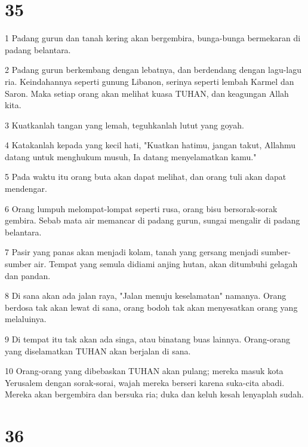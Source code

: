 \chapter{35}

\par 1 Padang gurun dan tanah kering akan bergembira, bunga-bunga bermekaran di padang belantara.
\par 2 Padang gurun berkembang dengan lebatnya, dan berdendang dengan lagu-lagu ria. Keindahannya seperti gunung Libanon, serinya seperti lembah Karmel dan Saron. Maka setiap orang akan melihat kuasa TUHAN, dan keagungan Allah kita.
\par 3 Kuatkanlah tangan yang lemah, teguhkanlah lutut yang goyah.
\par 4 Katakanlah kepada yang kecil hati, "Kuatkan hatimu, jangan takut, Allahmu datang untuk menghukum musuh, Ia datang menyelamatkan kamu."
\par 5 Pada waktu itu orang buta akan dapat melihat, dan orang tuli akan dapat mendengar.
\par 6 Orang lumpuh melompat-lompat seperti rusa, orang bisu bersorak-sorak gembira. Sebab mata air memancar di padang gurun, sungai mengalir di padang belantara.
\par 7 Pasir yang panas akan menjadi kolam, tanah yang gersang menjadi sumber-sumber air. Tempat yang semula didiami anjing hutan, akan ditumbuhi gelagah dan pandan.
\par 8 Di sana akan ada jalan raya, "Jalan menuju keselamatan" namanya. Orang berdosa tak akan lewat di sana, orang bodoh tak akan menyesatkan orang yang melaluinya.
\par 9 Di tempat itu tak akan ada singa, atau binatang buas lainnya. Orang-orang yang diselamatkan TUHAN akan berjalan di sana.
\par 10 Orang-orang yang dibebaskan TUHAN akan pulang; mereka masuk kota Yerusalem dengan sorak-sorai, wajah mereka berseri karena suka-cita abadi. Mereka akan bergembira dan bersuka ria; duka dan keluh kesah lenyaplah sudah.

\chapter{36}

